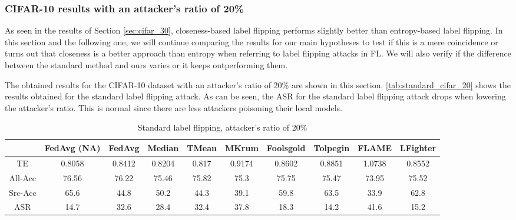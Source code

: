 \subsubsection{CIFAR-10 results with an attacker's ratio of 20\%}
As seen in the results of Section \ref{sec:cifar_30}, closeness-based label flipping performs slightly better than entropy-based label flipping. In this section and the following one, we will continue comparing the results for our main hypotheses to test if this is a mere coincidence or turns out that closeness is a better approach than entropy when referring to label flipping attacks in FL.
We will also verify if the difference between the standard method and ours varies or it keeps outperforming them.

The obtained results for the CIFAR-10 dataset with an attacker's ratio of 20\% are shown in this section.
\autoref{tab:standard_cifar_20} shows the results obtained for the standard label flipping attack. As can be seen, the ASR for the standard label flipping attack drops when lowering the attacker's ratio. This is normal since there are less attackers poisoning their local models.

\begin{table}[h!]
        \centering
        \small
        \begin{adjustbox}{center}
        \begin{tabular}{|c|c|c|c|c|c|c|c|c|c|}
                \hline
                & FedAvg (NA) & FedAvg & Median & TMean & MKrum & Foolsgold & Tolpegin & FLAME & LFighter \\
                \hline
                TE & 0.8058 & 0.8412 & 0.8204 & 0.817 & 0.9174 & 0.8602 & 0.8851 & 1.0738 & 0.8552 \\
                \hline
                All-Acc & 76.56 & 76.22 & 75.46 & 75.82 & 75.3 & 75.75 & 75.47 & 73.95 & 75.52 \\
                \hline
                Src-Acc & 65.6 & 44.8 & 50.2 & 44.3 & 39.1 & 59.8 & 63.5 & 33.9 & 62.8 \\
                \hline
                ASR & 14.7 & 32.6 & 28.4 & 32.4 & 37.8 & 18.3 & 14.2 & 41.6 & 15.2 \\
                \hline
        \end{tabular}
        \end{adjustbox}
        \caption{Standard label flipping, attacker's ratio of 20\%}
        \label{tab:standard_cifar_20}
    \end{table}
    

